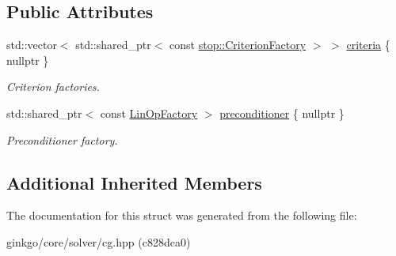 \subsection*{Public Attributes}
\begin{DoxyCompactItemize}
\item 
\mbox{\label{structgko_1_1solver_1_1Cg_1_1parameters__type_af8544e18d6657180b3a13a98c79e4fa8}} 
std\+::vector$<$ std\+::shared\+\_\+ptr$<$ const \hyperlink{group__stop_gab12a51109c50b35ec36dc5a393d6a9a0}{stop\+::\+Criterion\+Factory} $>$ $>$ \hyperlink{structgko_1_1solver_1_1Cg_1_1parameters__type_af8544e18d6657180b3a13a98c79e4fa8}{criteria} \{ nullptr \}
\begin{DoxyCompactList}\small\item\em Criterion factories. \end{DoxyCompactList}\item 
\mbox{\label{structgko_1_1solver_1_1Cg_1_1parameters__type_ab319c47fc1c31ad73d58c6aac4fdea6f}} 
std\+::shared\+\_\+ptr$<$ const \hyperlink{classgko_1_1LinOpFactory}{Lin\+Op\+Factory} $>$ \hyperlink{structgko_1_1solver_1_1Cg_1_1parameters__type_ab319c47fc1c31ad73d58c6aac4fdea6f}{preconditioner} \{ nullptr \}
\begin{DoxyCompactList}\small\item\em Preconditioner factory. \end{DoxyCompactList}\end{DoxyCompactItemize}
\subsection*{Additional Inherited Members}


The documentation for this struct was generated from the following file\+:\begin{DoxyCompactItemize}
\item 
ginkgo/core/solver/cg.\+hpp (c828dca0)\end{DoxyCompactItemize}
